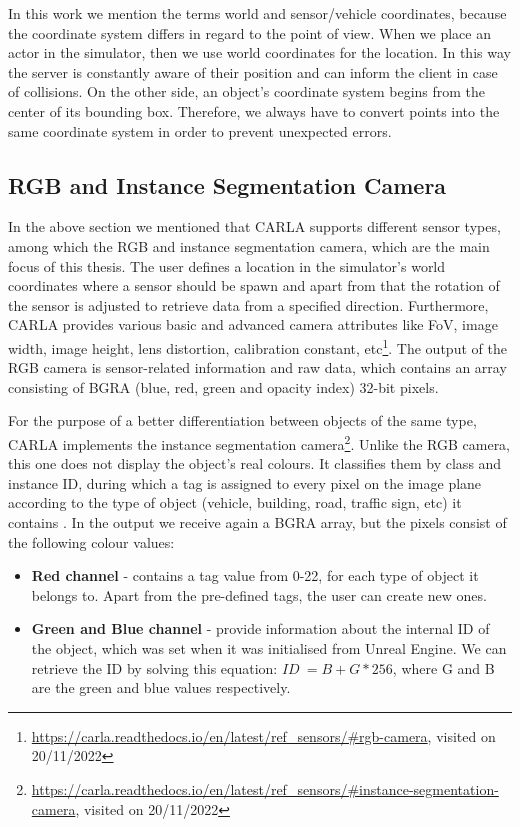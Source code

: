 In this work we mention the terms world and sensor/vehicle coordinates, because the coordinate system differs in regard to the point of view. When we place an actor in the simulator, then we use world coordinates for the location. In this way the server is constantly aware of their position and can inform the client in case of collisions. On the other side, an object's coordinate system begins from the center of its bounding box. Therefore, we always have to convert points into the same coordinate system in order to prevent unexpected errors.    

\subsection{RGB and Instance Segmentation Camera}\label{instance_camera}
In the above section we mentioned that CARLA supports different sensor types, among which the RGB and instance segmentation camera, which are the main focus of this thesis. The user defines a location in the simulator's world coordinates where a sensor should be spawn and apart from that the rotation of the sensor is adjusted to retrieve data from a specified direction. Furthermore, CARLA provides various basic and advanced camera attributes like FoV, image width, image height, lens distortion, calibration constant, etc\footnote{\url{https://carla.readthedocs.io/en/latest/ref_sensors/\#rgb-camera}, visited on 20/11/2022}. The output of the RGB camera is sensor-related information and raw data, which contains an array consisting of BGRA (blue, red, green and opacity index) 32-bit pixels.

For the purpose of a better differentiation between objects of the same type, CARLA implements the instance segmentation camera\footnote{\url{https://carla.readthedocs.io/en/latest/ref_sensors/\#instance-segmentation-camera}, visited on 20/11/2022}. Unlike the RGB camera, this one does not display the object's real colours. It classifies them by class and instance ID, during which a tag is assigned to every pixel on the image plane according to the type of object (vehicle, building, road, traffic sign, etc) it contains \cite{instance_segmenatation_cam}. In the output we receive again a BGRA array, but the pixels consist of the following colour values:
\begin{itemize}
    \item \textbf{Red channel} - contains a tag value from 0-22, for each type of object it belongs to. Apart from the pre-defined tags, the user can create new ones.
    \item \textbf{Green and Blue channel} - provide information about the internal ID of the object, which was set when it was initialised from Unreal Engine. We can retrieve the ID by solving this equation: $ID \: =  B + G * 256$, where G and B are the green and blue values respectively.
\end{itemize}

